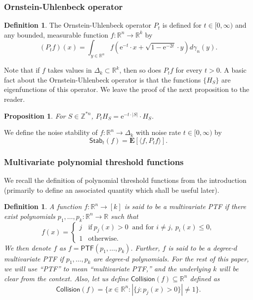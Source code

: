 \documentclass[11pt]{article}
\numberwithin{equation}{section}
\newtheorem{proposition}[theorem]{Proposition}
\theoremstyle{definition}
\newtheorem{definition}[theorem]{Definition}
\theoremstyle{plain}
\newcommand{\R}{\mathbb R}
\newcommand{\eee}{\mathrm e}
\newtheorem*{definition*}{Definition}
\begin{document}
\subsubsection*{Ornstein-Uhlenbeck operator} 
\begin{definition}
The Ornstein-Uhlenbeck  operator $P_t$ is defined for $t \in [0, \infty)$ and any bounded, measurable function $f: \mathbb{R}^n \rightarrow \mathbb{R}^k$ by
$$
(P_t f)(x) = \int_{y \in \mathbb{R}^n} f(\eee^{-t} \cdot x + \sqrt{1- \eee^{-2t}} \cdot y) d \gamma_n(y).
$$
%
\end{definition}
Note that if $f$ takes values in $\Delta_k \subset \R^k$, then so does $P_t f$ for every $t>0$. 
A basic fact about  the Ornstein-Uhlenbeck operator is that the functions $\{H_S\}$ are eigenfunctions of this operator. We leave the proof of the next proposition to the reader. 
\begin{proposition}
For $S \in \mathbb{Z}^{\ast n}$,
$P_t H_S = \eee^{-t \cdot |S|} \cdot H_S$. 
\end{proposition}
We define the noise stability of $f: \mathbb{R}^n \rightarrow \Delta_k$ with noise rate $t \in [0, \infty)$ by
\[
\mathsf{Stab}_t(f)  = \mathbf{E}[\langle f , P_t f \rangle]. 
\]
\subsubsection*{Multivariate polynomial threshold functions}
We recall the definition of polynomial threshold functions from the introduction (primarily to define an associated quantity which shall be useful later). 
\begin{definition*}
A function $f: \mathbb{R}^n \rightarrow [k]$ is said to be a multivariate PTF if there exist polynomials $p_1, \ldots, p_k : \mathbb{R}^n \rightarrow \mathbb{R}$ such that 
$$
f(x) = \begin{cases}
j  & \textrm{if} \  p_j(x)>0 \ \textrm{ and  for } i \neq j, \  p_{i}(x) \le 0, \\
1 & \textrm{otherwise.}\end{cases}
$$
We then denote $f$ as $f = \mathsf{PTF}(p_1, \ldots, p_k)$. Further, $f$ is
said to be a degree-$d$ multivariate PTF if   $p_1, \ldots, p_k$ are  degree-$d$ polynomials. For the rest of this paper, we will use ``PTF'' to mean
``multivariate PTF,'' and the underlying $k$ will be clear from the context. Also, let
us define $\mathsf{Collision} (f ) \subseteq \mathbb{R}^n$ defined as 
\[
\mathsf{Collision} (f) = \big\{x \in \mathbb{R}^n: |\{ j: p_j (x) > 0\}| \neq 1 \big\}. 
\]
\end{definition*}
\end{document}
